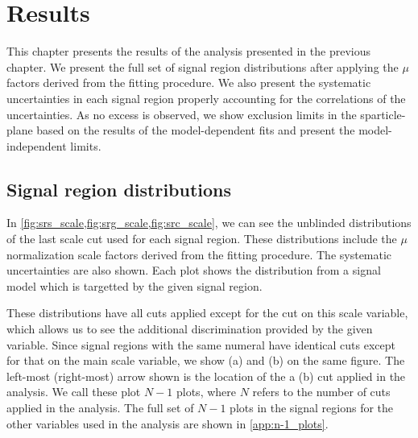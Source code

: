 

\chapter[Results][Results]{Results}

This chapter presents the results of the analysis presented in the previous chapter.
We present the full set of signal region distributions after applying the $\mu$ factors derived from the fitting procedure.
We also present the systematic uncertainties in each signal region properly accounting for the correlations of the uncertainties.
As no excess is observed, we show exclusion limits in the sparticle-\lsp~ plane based on the results of the model-dependent fits and present the model-independent limits.

\section{Signal region distributions}



In \cref{fig:srs_scale,fig:srg_scale,fig:src_scale}, we can see the unblinded distributions of the last scale cut used for each signal region.
These distributions include the $\mu$ normalization scale factors derived from the fitting procedure.
The systematic uncertainties are also shown.
Each plot shows the distribution from a signal model which is targetted by the given signal region.

These distributions have all cuts applied except for the cut on this scale variable, which allows us to see the additional discrimination provided by the given variable.
Since signal regions with the same numeral have identical cuts except for that on the main scale variable, we show (a) and (b) on the same figure.
The left-most (right-most) arrow shown is the location of the a (b) cut applied in the analysis.
We call these plot \textit{$N-1$} plots, where $N$ refers to the number of cuts applied in the analysis.
The full set of $N-1$ plots in the signal regions for the other variables used in the analysis are shown in \ref{app:n-1_plots}.

